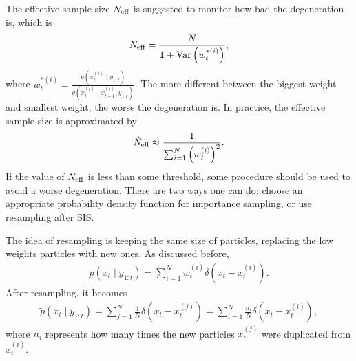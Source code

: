 The effective sample size $N_{\mbox{\scriptsize eff}}$ is suggested to monitor how bad the degeneration is, which is
\begin{align*}
N_{\mbox{\scriptsize eff}}=\frac{N}{1+\mathrm{Var}\left(w_t^{*(i)}\right)},
\end{align*}
where $w_t^{*(i)}=\frac{p\left(x_t^{(i)}\mid y_{1:t}\right)}{q\left(x_t^{(i)}\mid x_{t-1}^{(i)},y_{1:t}\right)}$. The more different between the biggest weight and smallest weight, the worse the degeneration is. In practice, the effective sample size is approximated by
\begin{align*}
\hat{N}_{\mbox{\scriptsize eff}}\approx \frac{1}{\sum_{i=1}^{N}\left(w_t^{(i)}\right)^2}.
\end{align*}
If the value of $N_{\mbox{\scriptsize eff}}$ is less than some threshold, some procedure should be used to avoid a worse degeneration. There are two ways one can do: choose an appropriate probability density function for importance sampling, or use resampling after SIS. 

The idea of resampling is keeping the same size of particles, replacing the low weights particles with new ones. As discussed before, 
\begin{align*}
p(x_t \mid y_{1:t})=\sum_{i=1}^Nw_t^{(i)} \delta \left(x_t -x_t^{(i)}\right).
\end{align*}
After resampling, it becomes
\begin{align*}
\tilde{p}(x_t \mid y_{1:t})=\sum_{j=1}^N\frac{1}{N} \delta \left(x_t -x_t^{(j)}\right)= \sum_{i=1}^N\frac{n_i}{N} \delta \left(x_t -x_t^{(i)}\right),
\end{align*}
where $n_i$ represents how many times the new particles $x_t^{(j)}$ were duplicated from$x_t^{(i)}$. 

